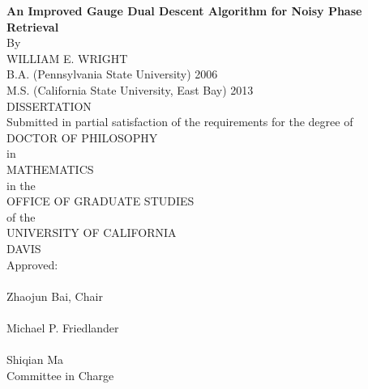 \begin{center}
   \null\vfill
   \textbf{%
      An Improved Gauge Dual Descent Algorithm for Noisy Phase Retrieval
   }%
   \\
   \bigskip
   By \\
   \bigskip
   WILLIAM E. WRIGHT \\
   \bigskip
   B.A. (Pennsylvania State University) 2006 \\
   M.S. (California State University, East Bay) 2013 \\
   \bigskip
   DISSERTATION \\
   \bigskip
   Submitted in partial satisfaction of the requirements for the
   degree of \\
   \bigskip
   DOCTOR OF PHILOSOPHY \\
   \bigskip
   in \\
   \bigskip
   MATHEMATICS\\
   \bigskip
   in the \\
   \bigskip
   OFFICE OF GRADUATE STUDIES \\
   \bigskip        
   of the \\
   \bigskip
   UNIVERSITY OF CALIFORNIA \\
   \bigskip
   DAVIS \\
   \bigskip
   Approved: \\
   \bigskip
   \bigskip
   \makebox[3in]{\hrulefill} \\
   Zhaojun Bai, Chair \\
   \bigskip
   \bigskip
   \makebox[3in]{\hrulefill} \\
   Michael P. Friedlander \\
   \bigskip
   \bigskip
   \makebox[3in]{\hrulefill} \\
   Shiqian Ma \\
   \bigskip
   Committee in Charge \\
    \\
   \vfill
\end{center}
